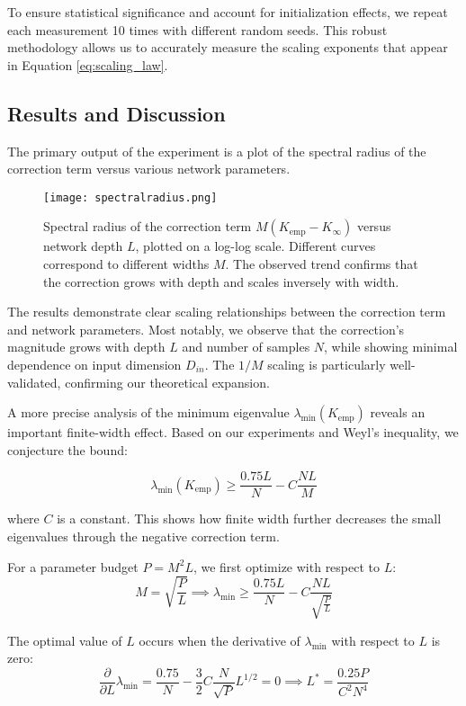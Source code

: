 \documentclass{article}
\begin{document}
To ensure statistical significance and account for initialization effects, we repeat each measurement 10 times with different random seeds. This robust methodology allows us to accurately measure the scaling exponents that appear in Equation \ref{eq:scaling_law}.

\subsection{Results and Discussion}

The primary output of the experiment is a plot of the spectral radius of the correction term versus various network parameters.
\newpage
\begin{figure}[!h]
    \centering
    \texttt{[image: spectralradius.png]}
    \caption{Spectral radius of the correction term $M(K_{\text{emp}} - K_{\infty})$ versus network depth $L$, plotted on a log-log scale. Different curves correspond to different widths $M$. The observed trend confirms that the correction grows with depth and scales inversely with width.}
    \label{fig:correction_vs_depth}
\end{figure}
\newpage
The results demonstrate clear scaling relationships between the correction term and network parameters. Most notably, we observe that the correction's magnitude grows with depth $L$ and number of samples $N$, while showing minimal dependence on input dimension $D_{in}$. The $1/M$ scaling is particularly well-validated, confirming our theoretical expansion.

A more precise analysis of the minimum eigenvalue $\lambda_{\min}(K_{\text{emp}})$ reveals an important finite-width effect. Based on our experiments and Weyl's inequality, we conjecture the bound:

\[ \lambda_{\min}(K_{\text{emp}}) \ge \frac{0.75L}{N} - C \frac{NL}{M} \]

where $C$ is a constant. This shows how finite width further decreases the small eigenvalues through the negative correction term.

For a parameter budget $P = M^2L$, we first optimize with respect to $L$:
\[
M = \sqrt{\frac{P}{L}} \implies \lambda_{\min} \ge \frac{0.75L}{N} - C \frac{NL}{\sqrt{\frac{P}{L}}} 
\]

The optimal value of $L$ occurs when the derivative of $\lambda_{\min}$ with respect to $L$ is zero:
\[
\frac{\partial}{\partial L} \lambda_{\min} = \frac{0.75}{N} - \frac{3}{2} C \frac{N}{\sqrt{P}} L^{1/2} = 0 \implies L^* = \frac{0.25 P}{C^2 N^4}
\]
\end{document}
